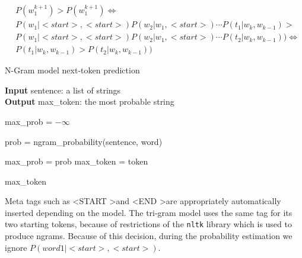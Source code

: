\documentclass[11pt, a4paper]{article}
\begin{document}
	\begin{equation}
		\label{eq::trigram_sentence_probs}
		\begin{aligned}
			& P(w^{k+1}_1) > P(w^{k+1}_1) \iff \\
			& P(w_1|<start>, <start>) P(w_2|w_1, <start>) \cdots P(t_1|w_k, w_{k-1}) > \\ & P(w_1|<start>, <start>) P(w_2|w_1, <start>) \cdots P(t_2|w_k, w_{k-1})) \iff \\
			& P(t_1|w_k, w_{k-1}) > P(t_2|w_k, w_{k-1}))
		\end{aligned}
	\end{equation}
	
	
	
	\begin{algorithm}
		\caption{N-Gram model next-token prediction} 
		\label{al::next_token}
		
		\hspace*{\algorithmicindent} \textbf{Input} sentence: a list of strings\\
		\hspace*{\algorithmicindent} \textbf{Output} max\_token: the most probable string
		\begin{algorithmic}[1]
			
			\State max\_prob = $-\infty$
			
			
					\State prob = ngram\_probability(sentence, word)
					
						\State max\_prob = prob
						\State max\_token = token
					\EndIf
				
				\EndIf
			
			\EndFor
			
			\State \Return max\_token
		\end{algorithmic} 
	\end{algorithm}
	
	
	Meta tags such as \textless START \textgreater  and \textless END \textgreater  are appropriately automatically inserted depending on the model. The tri-gram model uses the same tag for its two starting tokens, because of restrictions of the \texttt{nltk} library which is used to produce ngrams. Because of this decision, during the probability estimation we ignore $P(word1 | <start>, <start> )$.
	
	
	
	
	
	
	
\end{document}
